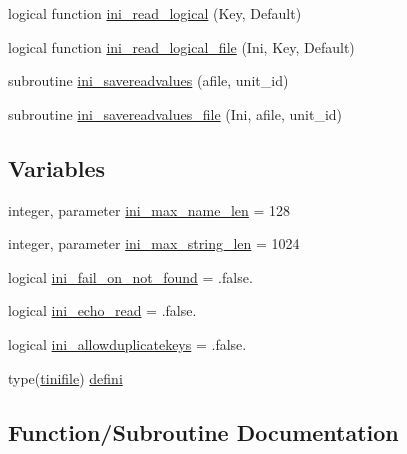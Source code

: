 \begin{DoxyCompactItemize}
\item 
logical function \mbox{\hyperlink{namespaceinifile_aaca241da4d51d99116aa6986a2fa9a49}{ini\+\_\+read\+\_\+logical}} (Key, Default)
\item 
logical function \mbox{\hyperlink{namespaceinifile_aa28324391b14e57e0c2a11866bda19f6}{ini\+\_\+read\+\_\+logical\+\_\+file}} (Ini, Key, Default)
\item 
subroutine \mbox{\hyperlink{namespaceinifile_a49bf986c5eea73c39bf9c4168143e81b}{ini\+\_\+savereadvalues}} (afile, unit\+\_\+id)
\item 
subroutine \mbox{\hyperlink{namespaceinifile_a2e53433c13f03131abc980a06455e53b}{ini\+\_\+savereadvalues\+\_\+file}} (Ini, afile, unit\+\_\+id)
\end{DoxyCompactItemize}
\subsection*{Variables}
\begin{DoxyCompactItemize}
\item 
integer, parameter \mbox{\hyperlink{namespaceinifile_aca6c65c541b90a27fa1d196098820185}{ini\+\_\+max\+\_\+name\+\_\+len}} = 128
\item 
integer, parameter \mbox{\hyperlink{namespaceinifile_a32faebf83b580d14b5af965dcb4eebfd}{ini\+\_\+max\+\_\+string\+\_\+len}} = 1024
\item 
logical \mbox{\hyperlink{namespaceinifile_af2ea5b648018a1448db850e370de1486}{ini\+\_\+fail\+\_\+on\+\_\+not\+\_\+found}} = .false.
\item 
logical \mbox{\hyperlink{namespaceinifile_a411a55fcdbda40f4d2023d7a887adf60}{ini\+\_\+echo\+\_\+read}} = .false.
\item 
logical \mbox{\hyperlink{namespaceinifile_a52182dda791468397009e779cd19eb94}{ini\+\_\+allowduplicatekeys}} = .false.
\item 
type(\mbox{\hyperlink{structinifile_1_1tinifile}{tinifile}}) \mbox{\hyperlink{namespaceinifile_aba287d83fd6e9c158ca1906470148d9d}{defini}}
\end{DoxyCompactItemize}


\subsection{Function/\+Subroutine Documentation}
\mbox{\label{namespaceinifile_a78d82ad0d3252c4a2d546ee63b37b9b4}} 
